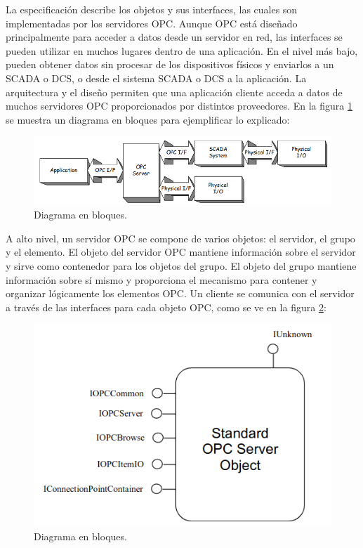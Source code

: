 La especificación describe los objetos y sus interfaces, las cuales son implementadas por los servidores OPC. Aunque OPC está diseñado principalmente para acceder a datos desde un servidor en red, las interfaces se pueden utilizar en muchos lugares dentro de una aplicación. En el nivel más bajo, pueden obtener datos sin procesar de los dispositivos físicos y enviarlos a un SCADA o DCS, o desde el sistema SCADA o DCS a la aplicación. La arquitectura y el diseño permiten que una aplicación cliente acceda a datos de muchos servidores OPC proporcionados por distintos proveedores. En la figura \ref{fig:OPCbloques} se muestra un diagrama en bloques para ejemplificar lo explicado:

\begin{figure}[htpb]
	\centering
	\includegraphics[scale=0.4]{./Figures/opc_2.png}
	\caption{Diagrama en bloques\protect\footnotemark.}
	\label{fig:OPCbloques}
\end{figure}


A alto nivel, un servidor OPC se compone de varios objetos: el servidor, el grupo y el elemento. El objeto del servidor OPC mantiene información sobre el servidor y sirve como contenedor para los objetos del grupo. El objeto del grupo mantiene información sobre sí mismo y proporciona el mecanismo para contener y organizar lógicamente los elementos OPC. Un cliente se comunica con el servidor a través de las interfaces para cada objeto OPC, como se ve en la figura \ref{fig:OPCapi}:

\begin{figure}[htpb]
	\centering
	\includegraphics[scale=0.4]{./Figures/opc_3.png}
	\caption{Diagrama en bloques\protect\footnotemark.}
	\label{fig:OPCapi}
\end{figure}

